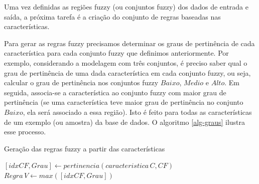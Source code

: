 \documentclass[template.tex]{subfiles}
\begin{document}
Uma vez definidas as regiões fuzzy (ou conjuntos fuzzy) dos dados de entrada e saída, a próxima tarefa é a criação do conjunto de regras baseadas nas características. %
%


Para gerar as regras fuzzy precisamos determinar os graus de pertinência de cada característica para cada conjunto fuzzy que definimos anteriormente. Por exemplo, considerando a modelagem com três conjuntos, é preciso saber qual o grau de pertinência de uma dada característica em cada conjunto fuzzy, ou seja, calcular o grau de pertinência nos conjuntos fuzzy $Baixo$, $Medio$ e $Alto$. Em seguida, associa-se a característica ao conjunto fuzzy com maior grau de pertinência (se uma característica teve maior grau de pertinência no conjunto $Baixo$, ela será associado a essa região). Isto é feito para todas as características de um exemplo (ou amostra) da base de dados. O algoritmo \ref{alg-graus} ilustra esse processo. 

\begin{algorithm}
\begin{algorithmic}[1]
\caption{Geração das regras fuzzy a partir das características}
\label{alg-graus}
      \STATE $[idxCF,Grau] \leftarrow pertinencia(caracteristica\,C,CF)$
      \ENDFOR
   \STATE $Regra \, V \leftarrow max([idxCF,Grau]) $
   \ENDFOR
\ENDFOR
\end{algorithmic}
\end{algorithm}
\end{document}
